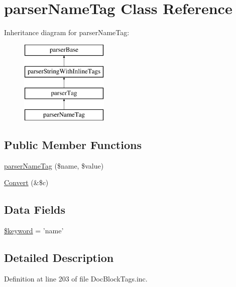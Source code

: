 \hypertarget{classparser_name_tag}{\section{parser\-Name\-Tag \-Class \-Reference}
\label{classparser_name_tag}
}
\-Inheritance diagram for parser\-Name\-Tag\-:\begin{figure}[H]
\begin{center}
\leavevmode
\includegraphics[height=4.000000cm]{classparser_name_tag}
\end{center}
\end{figure}
\subsection*{\-Public \-Member \-Functions}
\begin{DoxyCompactItemize}
\item 
\hyperlink{classparser_name_tag_a3a302ba4b49509270caa3c09b8821222}{parser\-Name\-Tag} (\$name, \$value)
\item 
\hyperlink{classparser_name_tag_ad6c06bea9d11cc1c362b592306cfa707}{\-Convert} (\&\$c)
\end{DoxyCompactItemize}
\subsection*{\-Data \-Fields}
\begin{DoxyCompactItemize}
\item 
\hyperlink{classparser_name_tag_a4a925d6b38bcf3957c713a7d3dc7da1f}{\$keyword} = 'name'
\end{DoxyCompactItemize}


\subsection{\-Detailed \-Description}


\-Definition at line 203 of file \-Doc\-Block\-Tags.\-inc.




